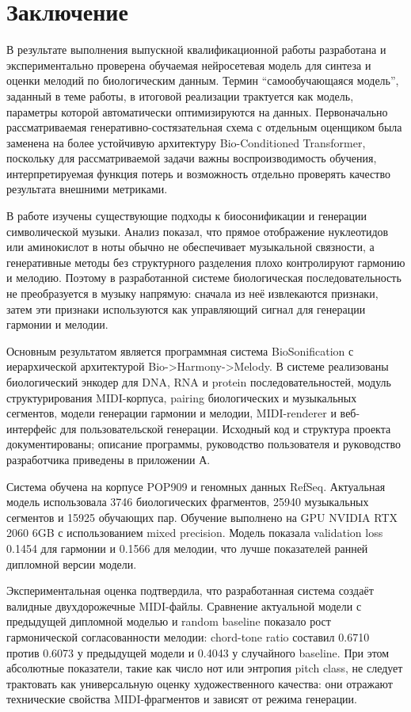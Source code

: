 \chapter*{Заключение}

В результате выполнения выпускной квалификационной работы разработана и экспериментально проверена обучаемая нейросетевая модель для синтеза и оценки мелодий по биологическим данным. Термин ``самообучающаяся модель'', заданный в теме работы, в итоговой реализации трактуется как модель, параметры которой автоматически оптимизируются на данных. Первоначально рассматриваемая генеративно-состязательная схема с отдельным оценщиком была заменена на более устойчивую архитектуру Bio-Conditioned Transformer, поскольку для рассматриваемой задачи важны воспроизводимость обучения, интерпретируемая функция потерь и возможность отдельно проверять качество результата внешними метриками.

В работе изучены существующие подходы к биосонификации и генерации символической музыки. Анализ показал, что прямое отображение нуклеотидов или аминокислот в ноты обычно не обеспечивает музыкальной связности, а генеративные методы без структурного разделения плохо контролируют гармонию и мелодию. Поэтому в разработанной системе биологическая последовательность не преобразуется в музыку напрямую: сначала из неё извлекаются признаки, затем эти признаки используются как управляющий сигнал для генерации гармонии и мелодии.

Основным результатом является программная система BioSonification с иерархической архитектурой Bio->Harmony->Melody. В системе реализованы биологический энкодер для DNA, RNA и protein последовательностей, модуль структурирования MIDI-корпуса, pairing биологических и музыкальных сегментов, модели генерации гармонии и мелодии, MIDI-renderer и веб-интерфейс для пользовательской генерации. Исходный код и структура проекта документированы; описание программы, руководство пользователя и руководство разработчика приведены в приложении А.

Система обучена на корпусе POP909 и геномных данных RefSeq. Актуальная модель использовала 3746 биологических фрагментов, 25940 музыкальных сегментов и 15925 обучающих пар. Обучение выполнено на GPU NVIDIA RTX 2060 6GB с использованием mixed precision. Модель показала validation loss 0.1454 для гармонии и 0.1566 для мелодии, что лучше показателей ранней дипломной версии модели.

Экспериментальная оценка подтвердила, что разработанная система создаёт валидные двухдорожечные MIDI-файлы. Сравнение актуальной модели с предыдущей дипломной моделью и random baseline показало рост гармонической согласованности мелодии: chord-tone ratio составил 0.6710 против 0.6073 у предыдущей модели и 0.4043 у случайного baseline. При этом абсолютные показатели, такие как число нот или энтропия pitch class, не следует трактовать как универсальную оценку художественного качества: они отражают технические свойства MIDI-фрагментов и зависят от режима генерации.

